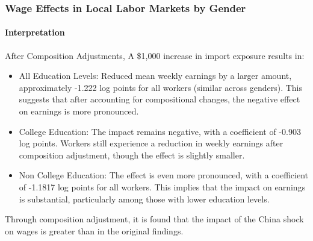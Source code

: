 \begin{frame}
    \frametitle{Wage Effects in Local Labor Markets by Gender}
    \framesubtitle{Interpretation}

        After Composition Adjustments, A \$1,000 increase in import exposure results in:
        
        \begin{itemize}
            \item All Education Levels: Reduced mean weekly earnings by a larger amount, approximately -1.222 log points for all workers (similar across genders). This suggests that after accounting for compositional changes, the negative effect on earnings is more pronounced.
            
            \item College Education: The impact remains negative, with a coefficient of -0.903 log points. Workers still experience a reduction in weekly earnings after composition adjustment, though the effect is slightly smaller.
        
            \item Non College Education: The effect is even more pronounced, with a coefficient of -1.1817 log points for all workers. This implies that the impact on earnings is substantial, particularly among those with lower education levels.
        \end{itemize}
        
        Through composition adjustment, it is found that the impact of the China shock on wages is greater than in the original findings.
\end{frame}